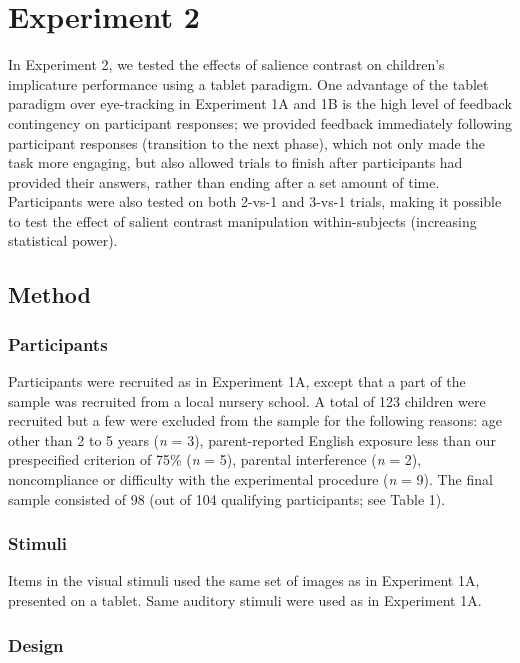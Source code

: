 \documentclass[a4paper,man,apacite,floatsintext]{apa6}
\begin{document}
\section{Experiment 2}\label{experiment-2}

In Experiment 2, we tested the effects of salience contrast on
children's implicature performance using a tablet paradigm. One
advantage of the tablet paradigm over eye-tracking in Experiment 1A and
1B is the high level of feedback contingency on participant responses;
we provided feedback immediately following participant responses
(transition to the next phase), which not only made the task more
engaging, but also allowed trials to finish after participants had
provided their answers, rather than ending after a set amount of time.
Participants were also tested on both 2-vs-1 and 3-vs-1 trials, making
it possible to test the effect of salient contrast manipulation
within-subjects (increasing statistical power).

\subsection{Method}\label{method-2}

\subsubsection{Participants}\label{participants-2}

Participants were recruited as in Experiment 1A, except that a part of
the sample was recruited from a local nursery school. A total of 123
children were recruited but a few were excluded from the sample for the
following reasons: age other than 2 to 5 years (\emph{n} = 3),
parent-reported English exposure less than our prespecified criterion of
75\% (\emph{n} = 5), parental interference (\emph{n} = 2), noncompliance
or difficulty with the experimental procedure (\emph{n} = 9). The final
sample consisted of 98 (out of 104 qualifying participants; see Table
1).

\subsubsection{Stimuli}\label{stimuli-1}

Items in the visual stimuli used the same set of images as in Experiment
1A, presented on a tablet. Same auditory stimuli were used as in
Experiment 1A.

\subsubsection{Design}\label{design}
\end{document}
